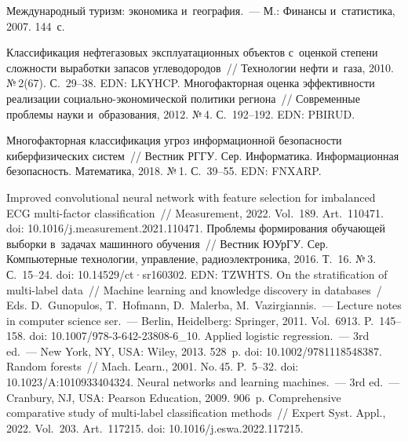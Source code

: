 \begin{multicols}{2}
{{\begin{thebibliography}{99}
 Международный туризм: экономика и~география.~--- М.: Финансы 
и~статистика, 2007. 144~с.

 Классификация нефтегазовых 
эксплуатационных объектов с~оценкой степени сложности выработки запасов 
углеводородов~// Технологии нефти и~газа, 2010. №\,2(67). С.~29--38. EDN: LKYHCP.
 Многофакторная оценка эф\-фек\-тив\-ности 
реализации со\-ци\-аль\-но-эко\-но\-ми\-че\-ской политики региона~// Современные  
проб\-ле\-мы науки и~образования, 2012. №\,4. С.~192--192. EDN: PBIRUD.

 Многофакторная классификация 
угроз информационной безопас\-ности киберфизических сис\-тем~// Вестник РГГУ. 
Сер. Информатика. Информационная безопас\-ность. Математика, 2018. №\,1.  
С.~39--55. EDN: FNXARP.


 Improved convolutional neural network 
with feature selection for imbalanced ECG multi-factor classification~// Measurement, 2022. 
Vol.~189. Art.~110471. doi: 10.1016/j.measurement.2021.110471.
 Проблемы формирования обучающей выборки 
в~задачах машинного обуче\-ния~// Вестник ЮУрГУ. Сер. Компьютерные технологии, 
управление, радиоэлектроника, 2016. Т.~16. №\,3. С.~15--24. doi: 10.14529/ct·sr160302. EDN: TZWHTS.
 On the stratification of multi-label data~// 
Machine learning and knowledge discovery in databases~/ Eds. 
D.~Gunopulos, T.~Hofmann, D.~Malerba, M.~Vazirgiannis.~--- Lecture notes in computer 
science ser.~--- Berlin, Heidelberg: Springer, 2011. Vol.~6913. P.~145--158. doi:  
10.1007/978-3-642-23808-6\_10.
 Applied logistic regression.~--- 
 3rd ed.~--- New York, NY, USA: Wiley, 2013. 528~p. doi: 
10.1002/9781118548387.
 Random forests~// Mach. Learn., 2001. No.\,45. P.~5--32. doi: 
10.1023/A:1010933404324.
 Neural networks and learning machines.~--- 3rd ed.~--- Cranbury, NJ, USA: 
Pearson Education, 2009. 906~p.
Comprehensive comparative study of multi-label classification methods~// Expert Syst.  
Appl., 2022. Vol.~203. Art.~117215. doi: 10.1016/j.eswa.2022.117215.

\end{thebibliography}

 }
 }

\end{multicols}

